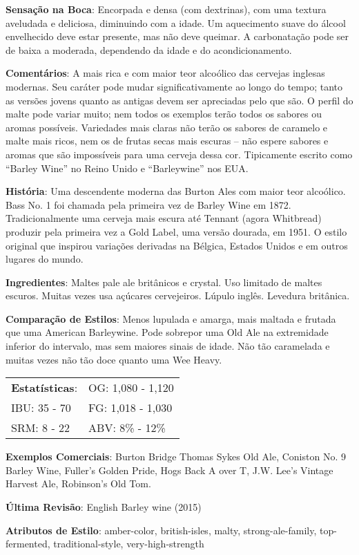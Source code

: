 \textbf{Sensação na Boca}: Encorpada e densa (com dextrinas), com uma textura aveludada e deliciosa, diminuindo com a idade. Um aquecimento suave do álcool envelhecido deve estar presente, mas não deve queimar. A carbonatação pode ser de baixa a moderada, dependendo da idade e do acondicionamento.

\textbf{Comentários}: A mais rica e com maior teor alcoólico das cervejas inglesas modernas. Seu caráter pode mudar significativamente ao longo do tempo; tanto as versões jovens quanto as antigas devem ser apreciadas pelo que são. O perfil do malte pode variar muito; nem todos os exemplos terão todos os sabores ou aromas possíveis. Variedades mais claras não terão os sabores de caramelo e malte mais ricos, nem os de frutas secas mais escuras – não espere sabores e aromas que são impossíveis para uma cerveja dessa cor. Tipicamente escrito como “Barley Wine” no Reino Unido e “Barleywine” nos EUA.

\textbf{História}: Uma descendente moderna das Burton Ales com maior teor alcoólico. Bass No. 1 foi chamada pela primeira vez de Barley Wine em 1872. Tradicionalmente uma cerveja mais escura até Tennant (agora Whitbread) produzir pela primeira vez a Gold Label, uma versão dourada, em 1951. O estilo original que inspirou variações derivadas na Bélgica, Estados Unidos e em outros lugares do mundo.

\textbf{Ingredientes}: Maltes pale ale britânicos e crystal. Uso limitado de maltes escuros. Muitas vezes usa açúcares cervejeiros. Lúpulo inglês. Levedura britânica.

\textbf{Comparação de Estilos}: Menos lupulada e amarga, mais maltada e frutada que uma American Barleywine. Pode sobrepor uma Old Ale na extremidade inferior do intervalo, mas sem maiores sinais de idade. Não tão caramelada e muitas vezes não tão doce quanto uma Wee Heavy.

\begin{tabular}{@{}p{35mm}p{35mm}@{}}
  \textbf{Estatísticas}: & OG: 1,080 - 1,120 \\
  IBU: 35 - 70  & FG: 1,018 - 1,030  \\
  SRM: 8 - 22  & ABV: 8\% - 12\%
\end{tabular}

\textbf{Exemplos Comerciais}: Burton Bridge Thomas Sykes Old Ale, Coniston No. 9 Barley Wine, Fuller’s Golden Pride, Hogs Back A over T, J.W. Lee’s Vintage Harvest Ale, Robinson’s Old Tom.

\textbf{Última Revisão}: English Barley wine (2015)


\textbf{Atributos de Estilo}: amber-color, british-isles, malty, strong-ale-family, top-fermented, traditional-style, very-high-strength
